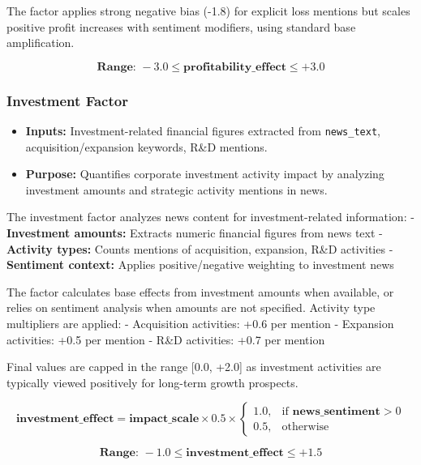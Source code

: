 \documentclass[3p,times,procedia]{elsarticle}
\begin{document}
The factor applies strong negative bias (-1.8) for explicit loss mentions but scales positive profit increases with sentiment modifiers, using standard base amplification.

\begin{equation}
\textbf{Range: } -3.0 \leq \textbf{profitability\_effect} \leq +3.0
\end{equation}


\vspace{0.20 cm}
\subsubsection{{Investment Factor}}
\begin{itemize}
    \item \textbf{Inputs:} Investment-related financial figures extracted from \texttt{news\_text}, acquisition/expansion keywords, R\&D mentions.
    \item \textbf{Purpose:} Quantifies corporate investment activity impact by analyzing investment amounts and strategic activity mentions in news.
\end{itemize}

The investment factor analyzes news content for investment-related information:
- \textbf{Investment amounts:} Extracts numeric financial figures from news text
- \textbf{Activity types:} Counts mentions of acquisition, expansion, R\&D activities
- \textbf{Sentiment context:} Applies positive/negative weighting to investment news

The factor calculates base effects from investment amounts when available, or relies on sentiment analysis when amounts are not specified. Activity type multipliers are applied:
- Acquisition activities: +0.6 per mention
- Expansion activities: +0.5 per mention  
- R\&D activities: +0.7 per mention

Final values are capped in the range [0.0, +2.0] as investment activities are typically viewed positively for long-term growth prospects.

\begin{equation}
\textbf{investment\_effect} = \textbf{impact\_scale} \times 0.5 \times 
\begin{cases} 
1.0, & \text{if } \textbf{news\_sentiment} > 0 \\
0.5, & \text{otherwise}
\end{cases}
\end{equation}

\begin{equation}
\textbf{Range: } -1.0 \leq \textbf{investment\_effect} \leq +1.5
\end{equation}
\end{document}

